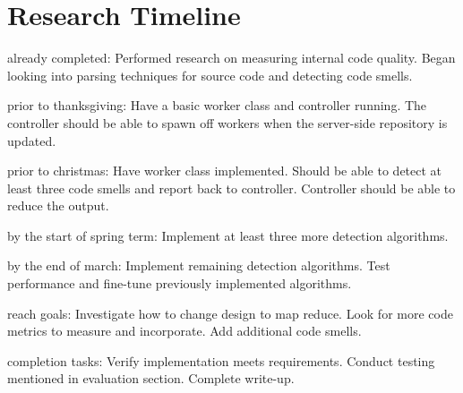 \documentclass{sig-alternate}
\begin{document}
\section{Research Timeline}
\label{sec:research_timeline}
\begin{itemize*}
	\item {\sc already completed}: Performed research on measuring internal code quality. Began looking into parsing techniques for source code and detecting code smells.\vspace{3pt}
	\item {\sc prior to thanksgiving}: Have a basic worker class and controller running. The controller should be able to spawn off workers when the server-side repository is updated.\vspace{3pt}
	\item {\sc prior to christmas}: Have worker class implemented. Should be able to detect at least three code smells and report back to controller. Controller should be able to reduce the output.\vspace{3pt}
\item {\sc by the start of spring term}: Implement at least three more detection algorithms.\vspace{3pt}	
\item {\sc by the end of march}: Implement remaining detection algorithms. Test performance and fine-tune previously implemented algorithms. \vspace{3pt}
\item {\sc reach goals}: Investigate how to change design to map reduce. Look for more code metrics to measure and incorporate. Add additional code smells. \vspace{3pt}
\item {\sc completion tasks}: Verify implementation meets requirements. Conduct testing mentioned in evaluation section. Complete write-up.\vspace{3pt}
\end{itemize*}


\vspace{175pt}



\end{document}
